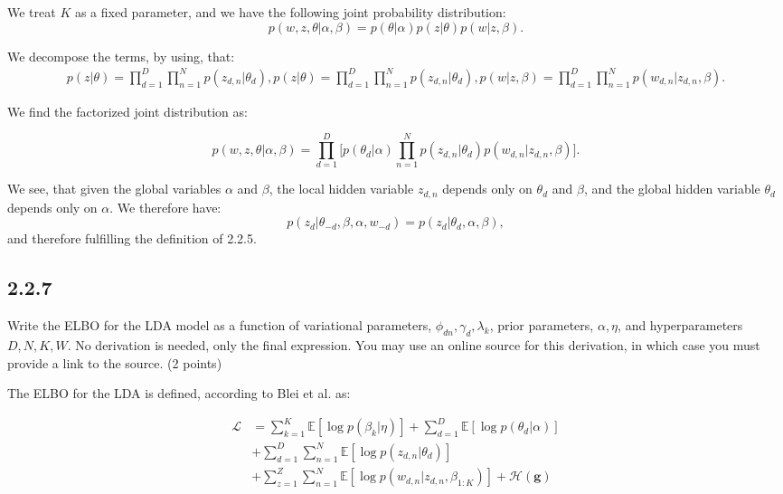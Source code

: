 \documentclass{article}
\begin{document}
\begin{multicols}{2}
We treat $K$ as a fixed parameter, and we have the following joint probability distribution:
\[
p(w, z, \theta | \alpha, \beta) = p(\theta | \alpha) p(z | \theta) p(w | z, \beta).
\]

We decompose the terms, by using, that:
\begin{align*}
p(z | \theta) = \prod_{d=1}^D \prod_{n=1}^N p(z_{d,n} | \theta_d),
p(z | \theta) = \prod_{d=1}^D \prod_{n=1}^N p(z_{d,n} | \theta_d),
p(w | z, \beta) = \prod_{d=1}^D \prod_{n=1}^N p(w_{d,n} | z_{d,n}, \beta).
\end{align*}

We find the factorized joint distribution as:

\[
p(w, z, \theta | \alpha, \beta) = \prod_{d=1}^D \Big[ p(\theta_d | \alpha) \prod_{n=1}^N p(z_{d,n} | \theta_d) p(w_{d,n} | z_{d,n}, \beta) \Big].
\]

We see, that given the global variables $\alpha$ and $\beta$, the local hidden variable $z_{d,n}$ depends only on $\theta_d$ and $\beta$, and the global hidden variable $\theta_d$ depends only on $\alpha$.
We therefore have:
\[
p(z_{d} |\theta_{-d}, \beta, \alpha, w_{-d}) = p(z_{d} |\theta_d, \alpha, \beta),
\]
and therefore fulfilling the definition of 2.2.5.


\subsection*{2.2.7}
Write the ELBO for the LDA model as a function of variational parameters, \(\phi_{dn}, \gamma_d, \lambda_k\), prior parameters, \(\alpha, \eta\), and hyperparameters \(D, N, K, W\). No derivation is needed, only the final expression. You may use an online source for this derivation, in which case you must provide a link to the source. (2 points)\bigskip

The ELBO for the LDA is defined, according to Blei et al. \cite{blei2009visualizing} as:

\begin{equation}
    \begin{aligned}
        \mathcal{L} &= \sum_{k=1}^{K} \mathbb{E}[\log p(\beta_k | \eta)]+\sum_{d=1}^{D} \mathbb{E}[\log p(\theta_d | \alpha)] \\
        &+ \sum_{d=1}^{D} \sum_{n=1}^{N} \mathbb{E}[\log p(z_{d,n} | \theta_d)] \\
        &+ \sum_{z=1}^{Z} \sum_{n=1}^{N} \mathbb{E}[\log p(w_{d,n} | z_{d,n}, \beta_{1:K})] + \mathcal{H}(\mathbf{g})
    \end{aligned}
\end{equation}


\end{multicols}
\end{document}
